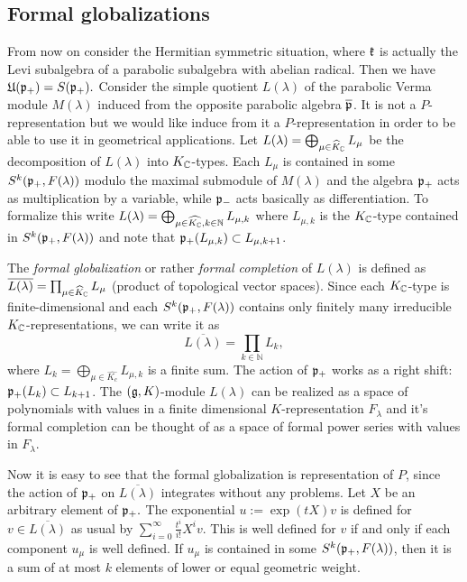 \documentclass[12pt,a4paper,final]{report}
\begin{document}
\subsection{Formal globalizations}

From now on consider the Hermitian symmetric situation, where $\mathfrak{k}$ is actually the Levi subalgebra of a parabolic subalgebra with abelian radical. Then we have $\mathfrak{U}(\mathfrak{p}_+) = S(\mathfrak{p}_+).$ Consider the simple quotient $L(\lambda)$ of the parabolic Verma module $M(\lambda)$ induced from the opposite parabolic algebra $\overline{\mathfrak{p}}$. It is not a $P$-representation but we would like induce from it a $P$-representation in order to be able to use it in geometrical applications. Let $L(\lambda)=\bigoplus_{\mu\in \widehat{K}_{\mathbb{C}}} L_\mu$ be the decomposition of $L(\lambda)$ into $K_{\mathbb{C}}$-types. Each $L_\mu$ is contained in some $S^k(\mathfrak{p}_+,F(\lambda))$ modulo the maximal submodule of $M(\lambda)$ and the algebra $\mathfrak{p}_+$ acts  as multiplication by a variable, while $\mathfrak{p}_-$ acts basically as differentiation. To formalize this write $L(\lambda) = \bigoplus_{\mu\in\widehat{K_{\mathbb{C}}}, k\in\mathbb{N}} L_{\mu,k}$ where $L_{\mu,k}$ is the $K_{\mathbb{C}}$-type contained in $S^k(\mathfrak{p}_+,F(\lambda))$ and note that $\mathfrak{p}_+ (L_{\mu,k}) \subset L_{\mu,k+1}$.


The \emph{formal globalization} or rather \emph{formal completion} of $L(\lambda)$ is defined as   $\overline{L(\lambda)}=\prod_{\mu\in \widehat{K}_{\mathbb{C}}} L_\mu$ (product of topological vector spaces).  Since each $K_{\mathbb{C}}$-type is finite-dimensional and each $S^k(\mathfrak{p}_+,F(\lambda))$ contains only finitely many irreducible $K_{\mathbb{C}}$-representations, we can write it as
\[\overline{L(\lambda)} = \prod_{k\in\mathbb{N}} L_k,\] %
where $L_k = \bigoplus_{\mu\in\widehat{K_c}} L_{\mu,k}$ is a finite sum. The action of $\mathfrak{p}_+$ works as a right shift: $\mathfrak{p}_+(L_k)\subset L_{k+1}$. The $(\mathfrak{g},K)$-module $L(\lambda)$ can be realized as a space of polynomials with values in a finite dimensional $K$-representation $F_\lambda$ and it's formal completion can be thought of as a space of formal power series with values in $F_\lambda$. %

Now it is easy to see that the formal globalization is representation of $P$, since the action of $\mathfrak{p}_+$ on $\overline{L(\lambda)}$ integrates without any problems. Let $X$ be an arbitrary element of $\mathfrak{p}_+.$ The exponential $u:=\exp(tX)v$ is defined for $v\in\overline{L(\lambda)}$ as usual by $\sum_{i=0}^\infty \frac{t^i}{i!} X^iv$. This is well defined for $v$ if and only if each component $u_\mu$ is well defined. If $u_\mu$ is contained in some $S^k(\mathfrak{p}_+,F(\lambda))$, then it is a sum of at most $k$ elements of lower or equal geometric weight.
\end{document}
